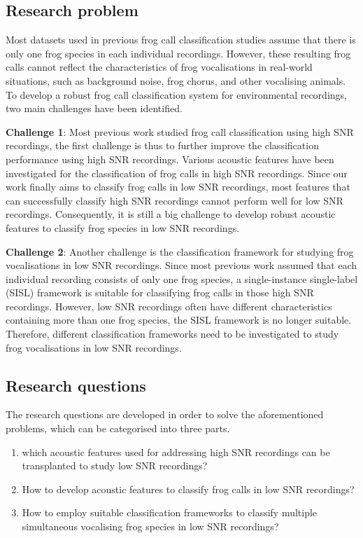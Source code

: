 \subsection{Research problem}
Most datasets used in previous frog call classification studies assume that there is only one frog species in each individual recordings. However, these resulting frog calls cannot reflect the characteristics of frog vocalisations in real-world situations, such as background noise, frog chorus, and other vocalising animals. To develop a robust frog call classification system for environmental recordings, two main challenges have been identified. 


\noindent \textbf{Challenge 1}: Most previous work studied frog call classification using high SNR recordings, the first challenge is thus to further improve the classification performance using high SNR recordings. Various acoustic features have been investigated for the classification of frog calls in high SNR recordings. Since our work finally aims to classify frog calls in low SNR recordings, most features that can successfully classify high SNR recordings cannot perform well for low SNR recordings. Consequently, it is still a big challenge to develop robust acoustic features to classify frog species in low SNR recordings. 

\noindent \textbf{Challenge 2}: Another challenge is the classification framework for studying frog vocalisations in low SNR recordings. Since most previous work assumed that each individual recording consists of only one frog species, a single-instance single-label (SISL) framework is suitable for classifying frog calls in those high SNR recordings. However, low SNR recordings often have different characteristics containing more than one frog species, the SISL framework is no longer suitable. Therefore, different classification frameworks need to be investigated to study frog vocalisations in low SNR recordings.



\subsection{Research questions}
The research questions are developed in order to solve the aforementioned problems, which can be categorised into three parts. 

 \begin{enumerate}
     \item which acoustic features used for addressing high SNR recordings can be transplanted to study low SNR recordings?
     \item How to develop acoustic features to classify frog calls in low SNR recordings?
     \item How to employ suitable classification frameworks to classify multiple simultaneous vocalising frog species in low SNR recordings?
  \end{enumerate}




